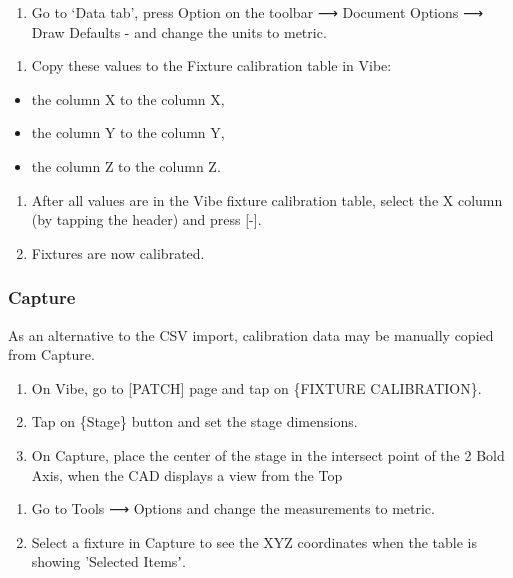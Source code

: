 \documentclass[
]{article}
\providecommand{\tightlist}{%
  \setlength{\itemsep}{0pt}\setlength{\parskip}{0pt}}
\begin{document}
\begin{enumerate}
\def\labelenumi{\arabic{enumi}.}
\setcounter{enumi}{4}
\tightlist
\item
  Go to `Data tab', press Option on the toolbar ⟶ Document Options ⟶ Draw Defaults - and change the units to metric.
\end{enumerate}

\begin{enumerate}
\def\labelenumi{\arabic{enumi}.}
\setcounter{enumi}{5}
\tightlist
\item
  Copy these values to the Fixture calibration table in Vibe:
\end{enumerate}

\begin{itemize}
\item
  the column X to the column X,
\item
  the column Y to the column Y,
\item
  the column Z to the column Z.
\end{itemize}

\begin{enumerate}
\def\labelenumi{\arabic{enumi}.}
\setcounter{enumi}{6}
\item
  After all values are in the Vibe fixture calibration table, select the X column (by tapping the header) and press {[}-{]}.
\item
  Fixtures are now calibrated.
\end{enumerate}

\hypertarget{capture}{%
\subsubsection{Capture}\label{capture}}

As an alternative to the CSV import, calibration data may be manually copied from Capture.

\begin{enumerate}
\def\labelenumi{\arabic{enumi}.}
\item
  On Vibe, go to {[}PATCH{]} page and tap on \{FIXTURE CALIBRATION\}.
\item
  Tap on \{Stage\} button and set the stage dimensions.
\item
  On Capture, place the center of the stage in the intersect point of the 2 Bold Axis, when the CAD displays a view from the Top
\end{enumerate}

\begin{enumerate}
\def\labelenumi{\arabic{enumi}.}
\setcounter{enumi}{3}
\item
  Go to Tools ⟶ Options and change the measurements to metric.
\item
  Select a fixture in Capture to see the XYZ coordinates when the table is showing 'Selected Itemsʼ.
\end{enumerate}
\end{document}
